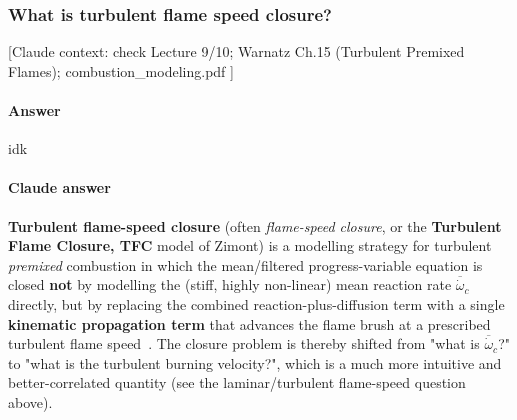 \subsubsection{What is turbulent flame speed closure?}

{\color{gray}\footnotesize [Claude context: check Lecture 9/10; Warnatz Ch.15 (Turbulent Premixed Flames); combustion\_modeling.pdf ]}

\paragraph{Answer} idk

{\color{istblue}
\paragraph{Claude answer}
\textbf{Turbulent flame-speed closure} (often \emph{flame-speed closure}, or the \textbf{Turbulent Flame Closure, TFC} model of Zimont) is a modelling strategy for turbulent \emph{premixed} combustion in which the mean/filtered progress-variable equation is closed \textbf{not} by modelling the (stiff, highly non-linear) mean reaction rate $\overline{\dot\omega}_c$ directly, but by replacing the combined reaction-plus-diffusion term with a single \textbf{kinematic propagation term} that advances the flame brush at a prescribed turbulent flame speed~\cite{lecture10,zimont2000tfc,veynante2002turbulent}. The closure problem is thereby shifted from "what is $\overline{\dot\omega}_c$?" to "what is the turbulent burning velocity?", which is a much more intuitive and better-correlated quantity (see the laminar/turbulent flame-speed question above).

}
